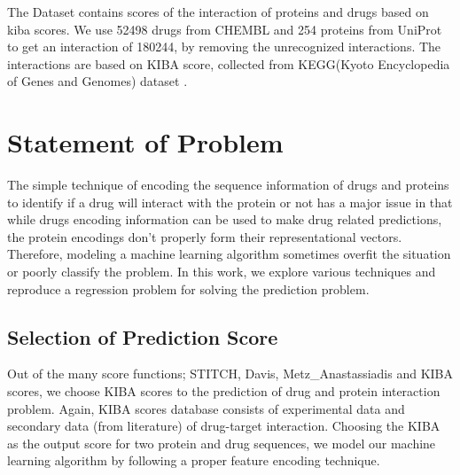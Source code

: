 \iffalse
(52498, 254)
180244
\fi
The Dataset contains scores of the interaction of proteins and drugs based on \acrshort{kiba} scores. We use 52498 drugs from CHEMBL and 254 proteins from UniProt to get an interaction of 180244, by removing the unrecognized interactions. The interactions are based on KIBA score, collected from KEGG(​Kyoto Encyclopedia of Genes and Genomes)​ dataset \cite{Kanehisa2000}.

\iffalse

For citations, use the function \textbackslash cite. \cite{gowar1989power} The references file is the sample.bib one. Google Scholar provides almost all the references in LaTeX form.

To insert a footnote, use the following command. \footnote{This is a footnote.} When necessary to use a nomenclature, define it on the same page for a better organization. Don't create NSN (Non-sense nomenclatures).

For figures, tables, equations and further information, open the file "tips.tex". If what you need is not found there, Google it.

\fi

\section{Statement of Problem}
The simple technique of encoding the sequence information of drugs and proteins to identify if a drug will interact with the protein or not has a major issue in that while drugs encoding information can be used to make drug related predictions, the protein encodings don't properly form their representational vectors. Therefore, modeling a machine learning algorithm sometimes overfit the situation or poorly classify the problem. In this work, we explore various techniques and reproduce a regression problem for solving the prediction problem.

\subsection{Selection of Prediction Score}

Out of the many score functions; STITCH, Davis, Metz\_Anastassiadis and KIBA scores, we choose KIBA scores to the prediction of drug and protein interaction problem. Again, KIBA scores database consists of experimental data and secondary data (from literature) of drug-target interaction. Choosing the KIBA as the output score for two protein and drug sequences, we model our machine learning algorithm by following a proper feature encoding technique.

